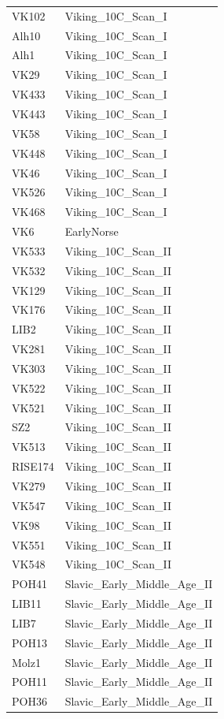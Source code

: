 \begin{longtable}[t]{ll}
VK102 & Viking\_10C\_Scan\_I\\
Alh10 & Viking\_10C\_Scan\_I\\
Alh1 & Viking\_10C\_Scan\_I\\
VK29 & Viking\_10C\_Scan\_I\\
VK433 & Viking\_10C\_Scan\_I\\
VK443 & Viking\_10C\_Scan\_I\\
VK58 & Viking\_10C\_Scan\_I\\
VK448 & Viking\_10C\_Scan\_I\\
VK46 & Viking\_10C\_Scan\_I\\
VK526 & Viking\_10C\_Scan\_I\\
VK468 & Viking\_10C\_Scan\_I\\
VK6 & EarlyNorse\\
VK533 & Viking\_10C\_Scan\_II\\
VK532 & Viking\_10C\_Scan\_II\\
VK129 & Viking\_10C\_Scan\_II\\
VK176 & Viking\_10C\_Scan\_II\\
LIB2 & Viking\_10C\_Scan\_II\\
VK281 & Viking\_10C\_Scan\_II\\
VK303 & Viking\_10C\_Scan\_II\\
VK522 & Viking\_10C\_Scan\_II\\
VK521 & Viking\_10C\_Scan\_II\\
SZ2 & Viking\_10C\_Scan\_II\\
VK513 & Viking\_10C\_Scan\_II\\
RISE174 & Viking\_10C\_Scan\_II\\
VK279 & Viking\_10C\_Scan\_II\\
VK547 & Viking\_10C\_Scan\_II\\
VK98 & Viking\_10C\_Scan\_II\\
VK551 & Viking\_10C\_Scan\_II\\
VK548 & Viking\_10C\_Scan\_II\\
POH41 & Slavic\_Early\_Middle\_Age\_II\\
LIB11 & Slavic\_Early\_Middle\_Age\_II\\
LIB7 & Slavic\_Early\_Middle\_Age\_II\\
POH13 & Slavic\_Early\_Middle\_Age\_II\\
Molz1 & Slavic\_Early\_Middle\_Age\_II\\
POH11 & Slavic\_Early\_Middle\_Age\_II\\
POH36 & Slavic\_Early\_Middle\_Age\_II\\

\end{longtable}
